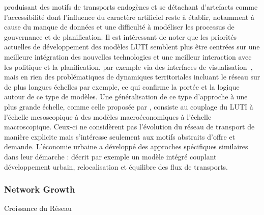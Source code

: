 {produisant des motifs de transports endogènes et se détachant d'artefacts comme l'accessibilité dont l'influence du caractère artificiel reste à établir, notamment à cause du manque de données et une difficulté à modéliser les processus de gouvernance et de planification. Il est intéressant de noter que les priorités actuelles de développement des modèles LUTI semblent plus être centrées sur une meilleure intégration des nouvelles technologies et une meilleur interaction avec les politique et la planification, par exemple via des interfaces de visualisation~\cite{JTLU611}, mais en rien des problématiques de dynamiques territoriales incluant le réseau sur de plus longues échelles par exemple, ce qui confirme la portée et la logique autour de ce type de modèles. Une généralisation de ce type d'approche à une plus grande échelle, comme celle proposée par \cite{russo2012unifying}, consiste au couplage du LUTI à l'échelle mesoscopique à des modèles macroéconomiques à l'échelle macroscopique. Ceux-ci ne considèrent pas l'évolution du réseau de transport de manière explicite mais s'intéresse seulement aux motifs abstraits d'offre et demande. L'économie urbaine a développé des approches spécifiques similaires dans leur démarche : \cite{masso2000} décrit par exemple un modèle intégré couplant développement urbain, relocalisation et équilibre des flux de transports.
}








\subsubsection{Network Growth}{Croissance du Réseau}


